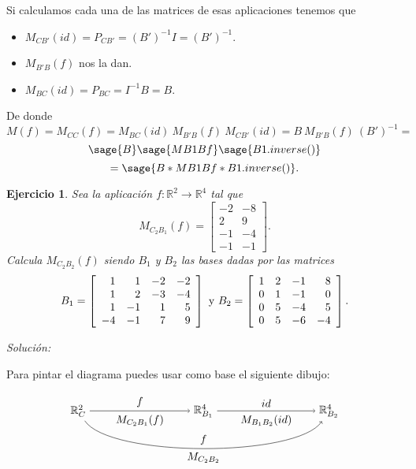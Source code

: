 \documentclass{amsart}
\newtheorem{ejer}{Ejercicio}
\def\r{\mathbb{R}}
\begin{document}
Si calculamos cada una de las matrices de esas aplicaciones tenemos que
\begin{itemize}
\item $M_{CB'}(id) = P_{CB'} = (B')^{-1}I = (B')^{-1}$.
\item $M_{B'B}(f)$ nos la dan.
\item $M_{BC}(id) = P_{BC} = I^{-1}B= B$. 
\end{itemize}

De donde 
\[ M(f) = M_{CC}(f) = M_{BC}(id) \ M_{B'B}(f) \ M_{CB'}(id) = B \ M_{B'B}(f) \ (B')^{-1} = \] 
\[ \sage{B}\sage{MB1Bf}\sage{B1.inverse()} \] 
\[ = \sage{B*MB1Bf*B1.inverse()}. \]



\begin{ejer} 
Sea la aplicación $f: \r^2\to \r^4$ tal que 
\[ M_{C_2B_1}(f) = \left[ \begin{array}{rr} -2 & -8 \\ 2 & 9 \\ -1 & -4 \\ 
-1 & -1 \end{array} \right]. \] Calcula $M_{C_2B_2}(f)$ siendo $B_1$ y $B_2$ 
las bases dadas por las matrices 
\[ B_1 = \left[ \begin{array}{rrrr} 1 & 1 & -2 & -2\\ 1 & 2 & -3 & -4\\ 
1 & -1 & 1 & 5\\ -4 & -1 & 7 & 9 \end{array} \right] \ \hbox{y} \ 
B_2 = \left[ \begin{array}{rrrr} 1 & 2 & -1 & 8\\ 0 & 1 & -1 & 0\\ 
0 & 5 & -4 & 5\\ 0 & 5 & -6 & -4 \end{array} \right].  \]
\end{ejer}

{\it Soluci\'on:}

Para pintar el diagrama puedes usar como base el siguiente dibujo:

$$
\begin{tikzpicture}[xscale = 2]
\node (RC)  at (0,0) {$\r^2_C$};
\node (RB1) at (2,0) {$\r^4_{B_1}$};
\node (RB2) at (4,0) {$\r^4_{B_2}$};
\draw[->] (RC)  to node [above] {$f$} 
                   node [below] {$M_{C_2B_1}(f)$} (RB1);
\draw[->] (RB1) to node [above] {$id$} 
                   node [below] {$M_{B_1B_2}(id)$} (RB2); 
\draw[->] (RC) .. controls (0.5,-1.5) and (3.5,-1.5) .. 
               node [above] {$f$}
               node [below] {$M_{C_2B_2}$} (RB2);
\end{tikzpicture}
$$
\end{document}
